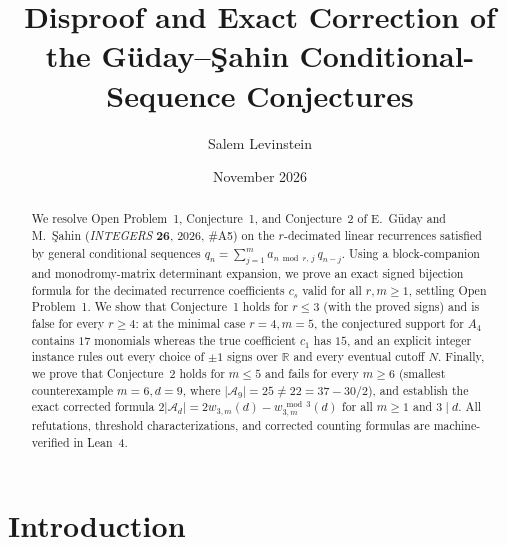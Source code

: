 \documentclass[11pt]{article}
\title{Disproof and Exact Correction of the G\"uday--\c{S}ahin Conditional-Sequence Conjectures}
\author{Salem Levinstein}
\date{November 2026}
\theoremstyle{remark}
\begin{document}
\maketitle

\begin{abstract}
We resolve Open Problem~1, Conjecture~1, and Conjecture~2 of E.~G\"uday and M.~\c{S}ahin (\emph{INTEGERS} \textbf{26}, 2026, \#A5) on the $r$-decimated linear recurrences satisfied by general conditional sequences $q_n = \sum_{j=1}^{m} a_{n \bmod r,\, j}\, q_{n-j}$. Using a block-companion and monodromy-matrix determinant expansion, we prove an exact signed bijection formula for the decimated recurrence coefficients $c_s$ valid for all $r, m \ge 1$, settling Open Problem~1. We show that Conjecture~1 holds for $r \le 3$ (with the proved signs) and is false for every $r \ge 4$: at the minimal case $r = 4, m = 5$, the conjectured support for $A_4$ contains $17$ monomials whereas the true coefficient $c_1$ has $15$, and an explicit integer instance rules out every choice of $\pm 1$ signs over $\mathbb{R}$ and every eventual cutoff $N$. Finally, we prove that Conjecture~2 holds for $m \le 5$ and fails for every $m \ge 6$ (smallest counterexample $m = 6, d = 9$, where $|\mathcal{A}_9| = 25 \ne 22 = 37 - 30/2$), and establish the exact corrected formula $2|\mathcal{A}_d| = 2 w_{3,m}(d) - w^{\bmod 3}_{3,m}(d)$ for all $m \ge 1$ and $3 \mid d$. All refutations, threshold characterizations, and corrected counting formulas are machine-verified in Lean~4.
\end{abstract}

\section{Introduction}
\end{document}
